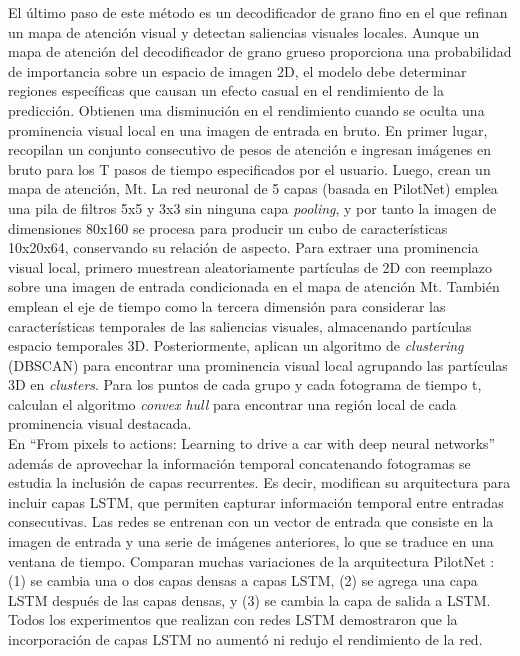 El último paso de este método es un decodificador de grano fino en el que refinan un mapa de atención visual y detectan saliencias visuales locales. Aunque un mapa de atención del decodificador de grano grueso proporciona una probabilidad de importancia sobre un espacio de imagen 2D, el modelo debe determinar regiones específicas que causan un efecto casual en el rendimiento de la predicción. Obtienen una disminución en el rendimiento cuando se oculta una prominencia visual local en una imagen de entrada en bruto. En primer lugar, recopilan un conjunto consecutivo de pesos de atención e ingresan imágenes en bruto para los T pasos de  tiempo especificados por el usuario. Luego, crean un mapa de atención, Mt. La red neuronal de 5 capas (basada en PilotNet) emplea una pila de filtros 5x5 y 3x3 sin ninguna capa \textit{pooling}, y por tanto la imagen de dimensiones 80x160 se procesa para producir un cubo de características 10x20x64, conservando su relación de aspecto. Para extraer una prominencia visual local, primero muestrean aleatoriamente partículas de 2D con reemplazo sobre una imagen de entrada condicionada en el mapa de atención Mt. También emplean el eje de tiempo como la tercera dimensión para considerar las características temporales de las saliencias visuales, almacenando partículas espacio temporales 3D. Posteriormente, aplican un algoritmo de \textit{clustering} (DBSCAN) para encontrar una prominencia visual local agrupando las partículas 3D en \textit{clusters}. Para los puntos de cada grupo y cada fotograma de tiempo t, calculan el algoritmo \textit{convex hull} para encontrar una región local de cada prominencia visual destacada.\\

En ``From pixels to actions: Learning to drive a car with deep neural networks'' \cite{pixels} además de aprovechar la información temporal concatenando fotogramas se estudia la inclusión de capas recurrentes. Es decir, modifican su arquitectura para incluir capas LSTM, que permiten capturar información temporal entre entradas consecutivas. Las redes se entrenan con un vector de entrada que consiste en la imagen de entrada y una serie de imágenes anteriores, lo que se traduce en una ventana de tiempo. Comparan muchas variaciones de la arquitectura PilotNet \cite{end2end}: (1) se cambia una o dos capas densas a capas LSTM, (2) se agrega una capa LSTM después de las capas densas, y (3) se cambia la capa de salida a LSTM. Todos los experimentos que realizan con redes LSTM demostraron que la incorporación de capas LSTM no aumentó ni redujo el rendimiento de la red.\\

